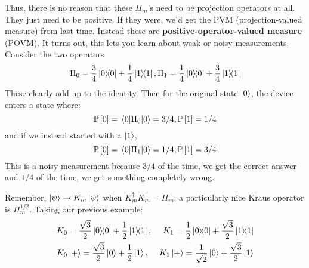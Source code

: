Thus, there is no reason that these $\Pi_m$'s need to be projection operators at all. They just need to be positive. If they were,
we'd get the PVM (projection-valued measure) from last time. Instead these are \textbf{positive-operator-valued measure} (POVM). It turns out,
this lets you learn about weak or noisy measurements. Consider the two operators
\[ \Pi_0 = \frac{3}{4} \ketbra{0} + \frac{1}{4} \ketbra{1}, \Pi_1 = \frac{1}{4} \ketbra{0} + \frac{3}{4} \ketbra{1} \]
These clearly add up to the identity. Then for the original state $\ket{0}$, the device enters a state where:
\[ \mathbb{P}\left[ 0 \right] = \mel{0}{\Pi_0}{0} = 3/4, \mathbb{P}\left[ 1 \right] = 1/4 \]
and if we instead started with a $\ket{1}$,
\[ \mathbb{P}\left[ 0 \right] = \mel{0}{\Pi_1}{0} = 1/4, \mathbb{P}\left[ 1 \right] = 3/4 \]
This is a noisy measurement because $3/4$ of the time, we get the correct answer and $1/4$ of the time, we get something completely wrong.

Remember, $\ket{\psi} \to K_m \ket{\psi}$ when $K_m^{\dagger} K_m = \Pi_m$; a particularly nice Kraus operator
is $\Pi_m^{1/2}$. Taking our previous example:
\begin{align*}
    &K_0 = \frac{\sqrt{3}}{2} \ketbra{0}{0} + \frac{1}{2} \ketbra{1}{1}, &K_1 = \frac{1}{2} \ketbra{0}{0} + \frac{\sqrt{3}}{2} \ketbra{1}{1}  \\
    &K_0 \ket{+} = \frac{\sqrt{3}}{2} \ket{0} + \frac{1}{2} \ket{1}, &K_1 \ket{+} = \frac{1}{\sqrt{2}} \ket{0} + \frac{\sqrt{3}}{2} \ket{1}
\end{align*}